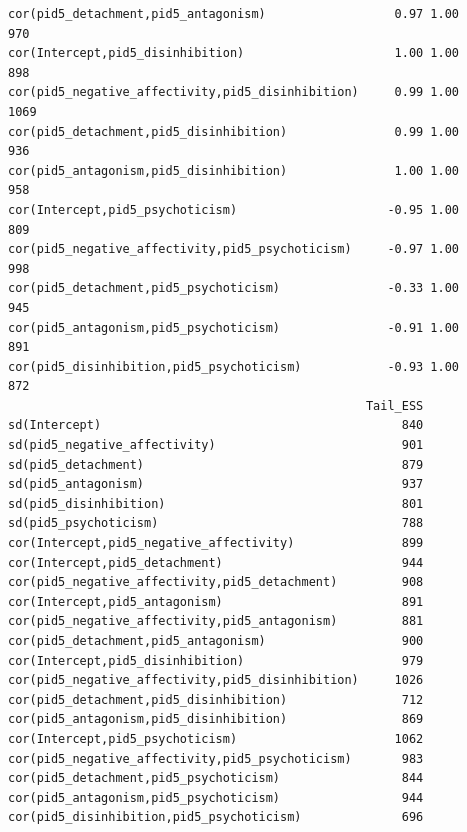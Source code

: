 \documentclass[
  11pt,
  a4paper,
  onecolumn]{article}
\begin{document}
\begin{verbatim}
cor(pid5_detachment,pid5_antagonism)                  0.97 1.00      970
cor(Intercept,pid5_disinhibition)                     1.00 1.00      898
cor(pid5_negative_affectivity,pid5_disinhibition)     0.99 1.00     1069
cor(pid5_detachment,pid5_disinhibition)               0.99 1.00      936
cor(pid5_antagonism,pid5_disinhibition)               1.00 1.00      958
cor(Intercept,pid5_psychoticism)                     -0.95 1.00      809
cor(pid5_negative_affectivity,pid5_psychoticism)     -0.97 1.00      998
cor(pid5_detachment,pid5_psychoticism)               -0.33 1.00      945
cor(pid5_antagonism,pid5_psychoticism)               -0.91 1.00      891
cor(pid5_disinhibition,pid5_psychoticism)            -0.93 1.00      872
                                                  Tail_ESS
sd(Intercept)                                          840
sd(pid5_negative_affectivity)                          901
sd(pid5_detachment)                                    879
sd(pid5_antagonism)                                    937
sd(pid5_disinhibition)                                 801
sd(pid5_psychoticism)                                  788
cor(Intercept,pid5_negative_affectivity)               899
cor(Intercept,pid5_detachment)                         944
cor(pid5_negative_affectivity,pid5_detachment)         908
cor(Intercept,pid5_antagonism)                         891
cor(pid5_negative_affectivity,pid5_antagonism)         881
cor(pid5_detachment,pid5_antagonism)                   900
cor(Intercept,pid5_disinhibition)                      979
cor(pid5_negative_affectivity,pid5_disinhibition)     1026
cor(pid5_detachment,pid5_disinhibition)                712
cor(pid5_antagonism,pid5_disinhibition)                869
cor(Intercept,pid5_psychoticism)                      1062
cor(pid5_negative_affectivity,pid5_psychoticism)       983
cor(pid5_detachment,pid5_psychoticism)                 844
cor(pid5_antagonism,pid5_psychoticism)                 944
cor(pid5_disinhibition,pid5_psychoticism)              696


\end{verbatim}
\end{document}
